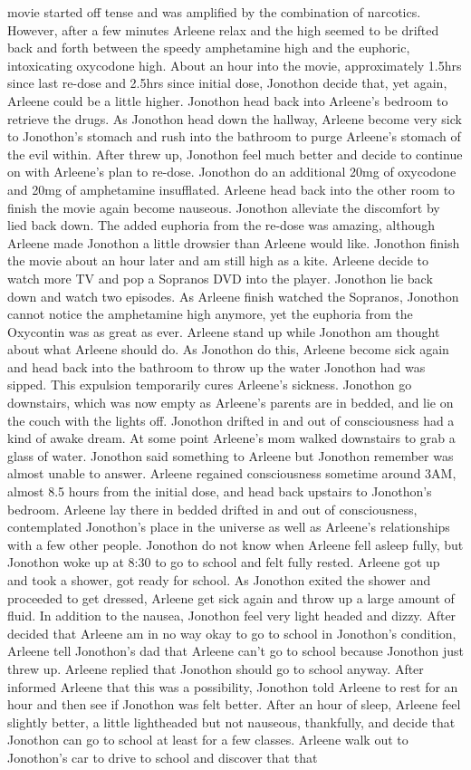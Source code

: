 \documentclass[12pt]{book}
\begin{document}
movie started off tense and was amplified by the combination of narcotics. However, after a few minutes Arleene relax and the high seemed to be drifted back and forth between the speedy amphetamine high and the euphoric, intoxicating oxycodone high. About an hour into the movie, approximately 1.5hrs since last re-dose and 2.5hrs since initial dose, Jonothon decide that, yet again, Arleene could be a little higher. Jonothon head back into Arleene's bedroom to retrieve the drugs. As Jonothon head down the hallway, Arleene become very sick to Jonothon's stomach and rush into the bathroom to purge Arleene's stomach of the evil within. After threw up, Jonothon feel much better and decide to continue on with Arleene's plan to re-dose. Jonothon do an additional 20mg of oxycodone and 20mg of amphetamine insufflated. Arleene head back into the other room to finish the movie again become nauseous. Jonothon alleviate the discomfort by lied back down. The added euphoria from the re-dose was amazing, although Arleene made Jonothon a little drowsier than Arleene would like. Jonothon finish the movie about an hour later and am still high as a kite. Arleene decide to watch more TV and pop a Sopranos DVD into the player. Jonothon lie back down and watch two episodes. As Arleene finish watched the Sopranos, Jonothon cannot notice the amphetamine high anymore, yet the euphoria from the Oxycontin was as great as ever. Arleene stand up while Jonothon am thought about what Arleene should do. As Jonothon do this, Arleene become sick again and head back into the bathroom to throw up the water Jonothon had was sipped. This expulsion temporarily cures Arleene's sickness. Jonothon go downstairs, which was now empty as Arleene's parents are in bedded, and lie on the couch with the lights off. Jonothon drifted in and out of consciousness had a kind of awake dream. At some point Arleene's mom walked downstairs to grab a glass of water. Jonothon said something to Arleene but Jonothon remember was almost unable to answer. Arleene regained consciousness sometime around 3AM, almost 8.5 hours from the initial dose, and head back upstairs to Jonothon's bedroom. Arleene lay there in bedded drifted in and out of consciousness, contemplated Jonothon's place in the universe as well as Arleene's relationships with a few other people. Jonothon do not know when Arleene fell asleep fully, but Jonothon woke up at 8:30 to go to school and felt fully rested. Arleene got up and took a shower, got ready for school. As Jonothon exited the shower and proceeded to get dressed, Arleene get sick again and throw up a large amount of fluid. In addition to the nausea, Jonothon feel very light headed and dizzy. After decided that Arleene am in no way okay to go to school in Jonothon's condition, Arleene tell Jonothon's dad that Arleene can't go to school because Jonothon just threw up. Arleene replied that Jonothon should go to school anyway. After informed Arleene that this was a possibility, Jonothon told Arleene to rest for an hour and then see if Jonothon was felt better. After an hour of sleep, Arleene feel slightly better, a little lightheaded but not nauseous, thankfully, and decide that Jonothon can go to school at least for a few classes. Arleene walk out to Jonothon's car to drive to school and discover that that 
\end{document}
